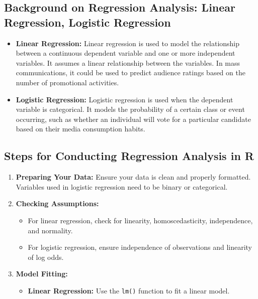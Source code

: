 \documentclass[
]{book}
\providecommand{\tightlist}{%
  \setlength{\itemsep}{0pt}\setlength{\parskip}{0pt}}
\begin{document}
\hypertarget{background-on-regression-analysis-linear-regression-logistic-regression}{%
\subsection*{Background on Regression Analysis: Linear Regression, Logistic Regression}\label{background-on-regression-analysis-linear-regression-logistic-regression}}

\begin{itemize}
\item
  \textbf{Linear Regression:} Linear regression is used to model the relationship between a continuous dependent variable and one or more independent variables. It assumes a linear relationship between the variables. In mass communications, it could be used to predict audience ratings based on the number of promotional activities.
\item
  \textbf{Logistic Regression:} Logistic regression is used when the dependent variable is categorical. It models the probability of a certain class or event occurring, such as whether an individual will vote for a particular candidate based on their media consumption habits.
\end{itemize}

\hypertarget{steps-for-conducting-regression-analysis-in-r}{%
\subsection*{Steps for Conducting Regression Analysis in R}\label{steps-for-conducting-regression-analysis-in-r}}

\begin{enumerate}
\def\labelenumi{\arabic{enumi}.}
\item
  \textbf{Preparing Your Data:} Ensure your data is clean and properly formatted. Variables used in logistic regression need to be binary or categorical.
\item
  \textbf{Checking Assumptions:}

  \begin{itemize}
  \tightlist
  \item
    For linear regression, check for linearity, homoscedasticity, independence, and normality.
  \item
    For logistic regression, ensure independence of observations and linearity of log odds.
  \end{itemize}
\item
  \textbf{Model Fitting:}

  \begin{itemize}
  \tightlist
  \item
    \textbf{Linear Regression:} Use the \texttt{lm()} function to fit a linear model.
  \end{itemize}
\end{enumerate}
\end{document}
